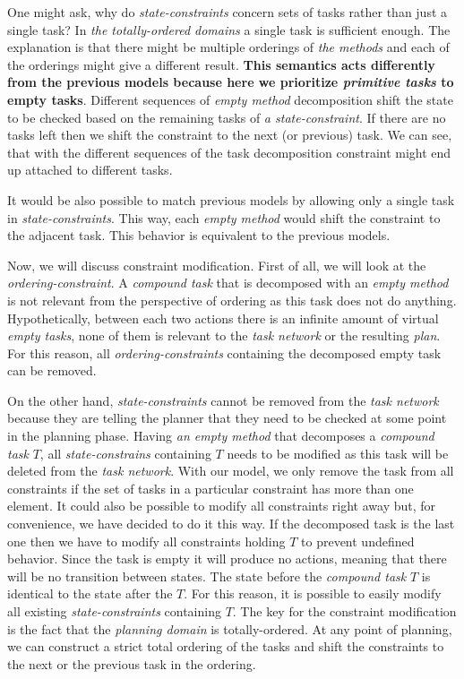 \medskip\noindent
One might ask, why do \emph{state-constraints} concern sets of tasks rather than just a single task? In \emph{the totally-ordered domains} a single task is sufficient enough. The explanation is that there might be multiple orderings of \emph{the methods} and each of the orderings might give a different result. \textbf{This semantics acts differently from the previous models because here we prioritize \emph{primitive tasks} to empty tasks}. Different sequences of \emph{empty method} decomposition shift the state to be checked based on the remaining tasks of \emph{a state-constraint}. If there are no tasks left then we shift the constraint to the next (or previous) task. We can see, that with the different sequences of the task decomposition constraint might end up attached to different tasks. 

\medskip\noindent
It would be also possible to match previous models by allowing only a single task in \emph{state-constraints}. This way, each \emph{empty method} would shift the constraint to the adjacent task. This behavior is equivalent to the previous models.

\medskip\noindent 
Now, we will discuss constraint modification. First of all, we will look at the \emph{ordering-constraint}. A \emph{compound task} that is decomposed with an \emph{empty method} is not relevant from the perspective of ordering as this task does not do anything. Hypothetically, between each two actions there is an infinite amount of virtual \emph{empty tasks}, none of them is relevant to the \emph{task network} or the resulting \emph{plan}. For this reason, all \emph{ordering-constraints} containing the decomposed empty task can be removed. 

\noindent
On the other hand, \emph{state-constraints} cannot be removed from the \emph{task network} because they are telling the planner that they need to be checked at some point in the planning phase. Having \emph{an empty method} that decomposes a \emph{compound task} $T$, all \emph{state-constrains} containing $T$ needs to be modified as this task will be deleted from the \emph{task network}. With our model, we only remove the task from all constraints if the set of tasks in a particular constraint has more than one element. It could also be possible to modify all constraints right away but, for convenience, we have decided to do it this way. If the decomposed task is the last one then we have to modify all constraints holding $T$ to prevent undefined behavior. Since the task is empty it will produce no actions, meaning that there will be no transition between states. The state before the \emph{compound task} $T$ is identical to the state after the $T$. For this reason, it is possible to easily modify all existing \emph{state-constraints} containing $T$. The key for the constraint modification is the fact that the \emph{planning domain} is totally-ordered. At any point of planning, we can construct a strict total ordering of the tasks and shift the constraints to the next or the previous task in the ordering.

